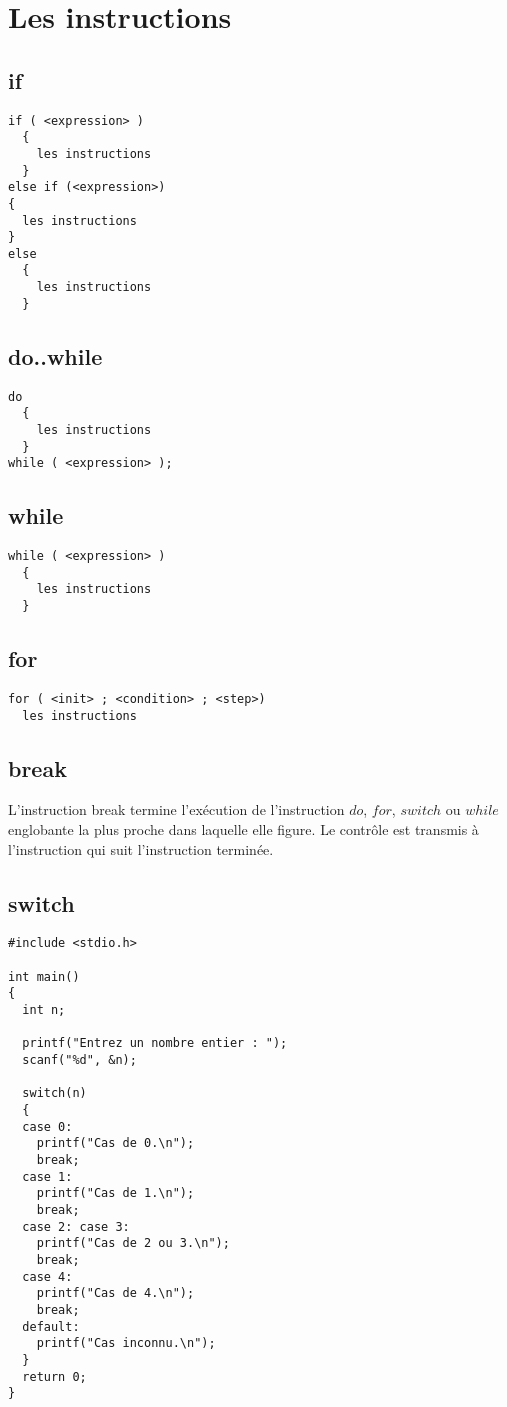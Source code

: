 \documentclass[a4paper]{article}
\begin{document}
\section{Les instructions}
\subsection{if}
\begin{lstlisting}
if ( <expression> )
  {
    les instructions
  }
else if (<expression>)
{
  les instructions
}
else
  {
    les instructions
  }
\end{lstlisting}
\subsection{do..while}
\begin{lstlisting}
do
  {
    les instructions
  }
while ( <expression> );
\end{lstlisting}
\subsection{while}
\begin{lstlisting}
while ( <expression> )
  {
    les instructions
  }
\end{lstlisting}
\subsection{for}
\begin{lstlisting}
for ( <init> ; <condition> ; <step>)
  les instructions
\end{lstlisting}
\subsection{break}
L'instruction break termine l'exécution de l'instruction $do$, $for$, $switch$ ou $while$ englobante la plus proche dans laquelle elle figure. Le contrôle est transmis à l'instruction qui suit l'instruction terminée.\subsection{switch}
\begin{lstlisting}
#include <stdio.h>

int main()
{
  int n;

  printf("Entrez un nombre entier : ");
  scanf("%d", &n);

  switch(n)
  {
  case 0:
    printf("Cas de 0.\n");
    break;
  case 1:
    printf("Cas de 1.\n");
    break;
  case 2: case 3:
    printf("Cas de 2 ou 3.\n");
    break;
  case 4:
    printf("Cas de 4.\n");
    break;
  default:
    printf("Cas inconnu.\n");
  }
  return 0;
}
\end{lstlisting}
\end{document}
